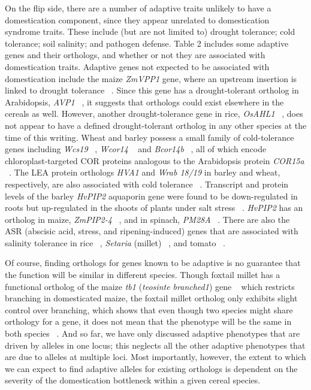 \documentclass[12pt]{article}
\begin{document}
On the flip side, there are a number of adaptive traits unlikely to have a domestication component, since they appear unrelated to domestication syndrome traits. These include (but are not limited to) drought tolerance; cold tolerance; soil salinity; and pathogen defense.  Table 2 includes some adaptive genes and their orthologs, and whether or not they are associated with domestication traits.  Adaptive genes not expected to be associated with domestication include the maize \textit{ZmVPP1} gene, where an upstream insertion is linked to drought tolerance ~\citep{Wang2016}.  Since this gene has a drought-tolerant ortholog in Arabidopsis, \textit{AVP1} ~\citep{Gaxiola2001}, it suggests that orthologs could exist elsewhere in the cereals as well. However, another drought-tolerance gene in rice, \textit{OsAHL1} ~\citep{Zhou2016}, does not appear to have a defined drought-tolerant ortholog in any other species at the time of this writing. Wheat and barley possess a small family of cold-tolerance genes including \textit{Wcs19} ~\citep{pmid8219063}, \textit{Wcor14} ~\citep{pmid10846621} and \textit{Bcor14b} ~\citep{pmid9952464}, all of which encode chloroplast-targeted COR proteins analogous to the Arabidopsis protein \textit{COR15a}  ~\citep{pmid9826741, Takumi2003}. The LEA protein orthologs \textit{HVA1} and \textit{Wrab 18/19} in barley and wheat, respectively, are also associated with cold tolerance ~\citep{Hong1988, pmid16755132}. Transcript and protein levels of the barley \textit{HvPIP2} aquaporin gene were found to be down-regulated in roots but up-regulated in the shoots of plants under salt stress ~\citep{Katsuhara2002}.  \textit{HvPIP2} has an ortholog in maize, \textit{ZmPIP2-4} ~\citep{Zhu2005}, and in spinach, \textit{PM28A} ~\citep{Fotiadis2000}. There are also the ASR (abscisic acid, stress, and ripening-induced) genes that are associated with salinity tolerance in rice ~\citep{Joo2013}, \textit{Setaria} (millet) ~\citep{Li2017}, and tomato ~\citep{Konrad2008}. 

Of course, finding orthologs for genes known to be adaptive is no guarantee that the function will be similar in different species. Though foxtail millet has a functional ortholog of the maize \textit{tb1} (\textit{teosinte branched1}) gene ~\citep{pmid9087405}  which restricts branching in domesticated maize, the foxtail millet ortholog only exhibits slight control over branching, which shows that even though two species might share orthology for a gene, it does not mean that the phenotype will be the same in both species ~\citep{Doust2004}. And so far, we have only discussed adaptive phenotypes that are driven by alleles in one locus; this neglects all the other adaptive phenotypes that are due to alleles at multiple loci.  Most importantly, however, the extent to which we can expect to find adaptive alleles for existing orthologs is dependent on the severity of the domestication bottleneck within a given cereal species.
\end{document}
